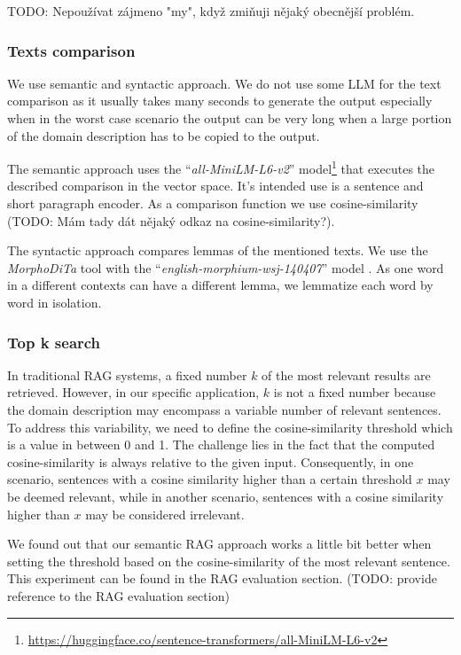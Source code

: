 TODO: Nepoužívat zájmeno "my", když zmiňuji nějaký obecnější problém. \\


\subsubsection{Texts comparison}
\label{texts_comparison}
We use semantic and syntactic approach. We do not use some LLM for the text comparison as it usually takes many seconds to generate the output especially when in the worst case scenario the output can be very long when a large portion of the domain description has to be copied to the output.

The semantic approach uses the ``\textit{all-MiniLM-L6-v2}'' model\footnote{\url{https://huggingface.co/sentence-transformers/all-MiniLM-L6-v2}} that executes the described comparison in the vector space. It's intended use is a sentence and short paragraph encoder. As a comparison function we use cosine-similarity (TODO: Mám tady dát nějaký odkaz na cosine-similarity?).

The syntactic approach compares lemmas of the mentioned texts. We use the \textit{MorphoDiTa} tool \cite{Strakova2014} with the ``\textit{english-morphium-wsj-140407}'' model \cite{Straka2014}. As one word in a different contexts can have a different lemma, we lemmatize each word by word in isolation.


\subsubsection{Top k search}

In traditional RAG systems, a fixed number $k$ of the most relevant results are retrieved. However, in our specific application, $k$ is not a fixed number because the domain description may encompass a variable number of relevant sentences. To address this variability, we need to define the cosine-similarity threshold which is a value in between 0 and 1. The challenge lies in the fact that the computed cosine-similarity is always relative to the given input. Consequently, in one scenario, sentences with a cosine similarity higher than a certain threshold $x$ may be deemed relevant, while in another scenario, sentences with a cosine similarity higher than $x$ may be considered irrelevant.

We found out that our semantic RAG approach works a little bit better when setting the threshold based on the cosine-similarity of the most relevant sentence. This experiment can be found in the RAG evaluation section. (TODO: provide reference to the RAG evaluation section) \\

